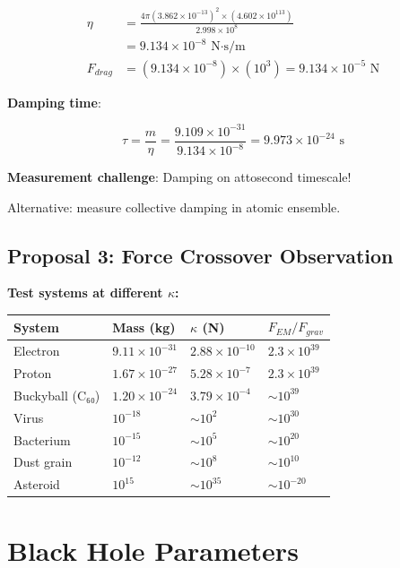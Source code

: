 \documentclass{article}
\begin{document}
\begin{align}
\eta &= \frac{4\pi (3.862 \times 10^{-13})^2 \times (4.602 \times 10^{113})}{2.998 \times 10^8} \\
&= 9.134 \times 10^{-8} \text{ N·s/m} \\
F_{drag} &= (9.134 \times 10^{-8}) \times (10^3) = 9.134 \times 10^{-5} \text{ N}
\end{align}

\textbf{Damping time}:

\begin{equation}
\tau = \frac{m}{\eta} = \frac{9.109 \times 10^{-31}}{9.134 \times 10^{-8}} = 9.973 \times 10^{-24} \text{ s}
\end{equation}

\textbf{Measurement challenge}: Damping on attosecond timescale!

Alternative: measure collective damping in atomic ensemble.

\subsection{Proposal 3: Force Crossover Observation}

\textbf{Test systems at different $\kappa$:}

\begin{longtable}{llll}
\toprule
\textbf{System} & \textbf{Mass (kg)} & \textbf{$\kappa$ (N)} & \textbf{$F_{EM}/F_{grav}$} \\
\midrule
Electron & $9.11 \times 10^{-31}$ & $2.88 \times 10^{-10}$ & $2.3 \times 10^{39}$ \\
Proton & $1.67 \times 10^{-27}$ & $5.28 \times 10^{-7}$ & $2.3 \times 10^{39}$ \\
Buckyball (C₆₀) & $1.20 \times 10^{-24}$ & $3.79 \times 10^{-4}$ & $\sim 10^{39}$ \\
Virus & $10^{-18}$ & $\sim 10^2$ & $\sim 10^{30}$ \\
Bacterium & $10^{-15}$ & $\sim 10^5$ & $\sim 10^{20}$ \\
Dust grain & $10^{-12}$ & $\sim 10^8$ & $\sim 10^{10}$ \\
Asteroid & $10^{15}$ & $\sim 10^{35}$ & $\sim 10^{-20}$ \\
\bottomrule
\end{longtable}

\section{Black Hole Parameters}
\end{document}
